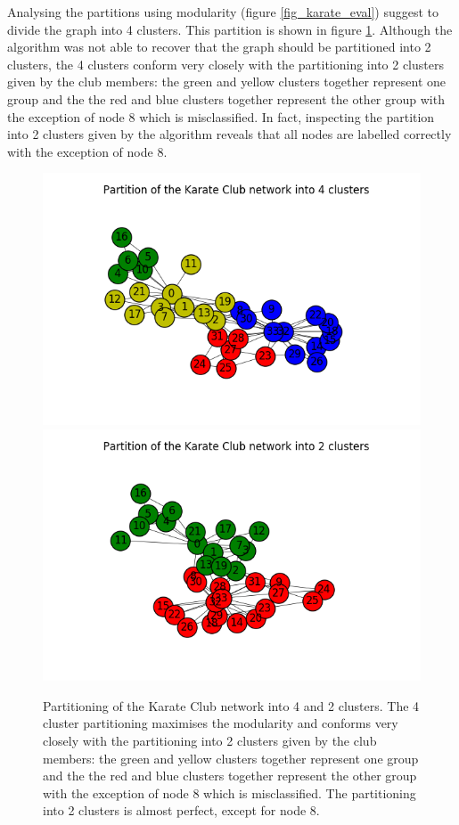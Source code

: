 \documentclass[12pt]{article}
\theoremstyle{definition}
\begin{document}
Analysing the partitions using modularity (figure \ref{fig_karate_eval}) suggest to divide the graph into 4 clusters. This partition is shown in figure \ref{fig_karate_partition4}. Although the algorithm was not able to recover that the graph should be partitioned into 2 clusters, the 4 clusters conform very closely with the partitioning into 2 clusters given by the club members: the green and yellow clusters together represent one group and the the red and blue clusters together represent the other group with the exception of node 8 which is misclassified. In fact, inspecting the partition into 2 clusters given by the algorithm reveals that all nodes are labelled correctly with the exception of node 8.
\begin{figure}[h]
	\includegraphics[scale=0.44]{karate_graph_partition4}
	\includegraphics[scale=0.44]{karate_graph_partition2}
	\centering
	\caption{Partitioning of the Karate Club network into 4 and 2 clusters. The 4 cluster partitioning maximises the modularity and conforms very closely with the partitioning into 2 clusters given by the club members: the green and yellow clusters together represent one group and the the red and blue clusters together represent the other group with the exception of node 8 which is misclassified. The partitioning into 2 clusters is almost perfect, except for node 8.}
	\label{fig_karate_partition4}
\end{figure}
\end{document}
